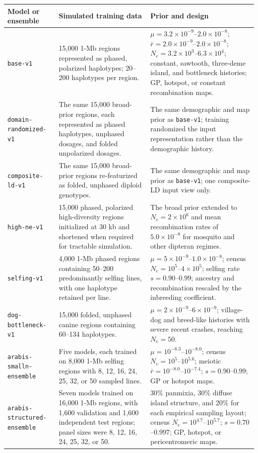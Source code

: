 \scriptsize
\begin{tabular}{@{}p{3.55cm}p{6.15cm}p{7.05cm}@{}}
\toprule
Model or ensemble & Simulated training data & Prior and design \\
\midrule
\texttt{base-v1} & 15,000 1-Mb regions represented as phased, polarized haplotypes; 20--200 haplotypes per region. & $\mu=3.2\times10^{-9}$--$2.0\times10^{-8}$; $\bar r=2.0\times10^{-9}$--$2.0\times10^{-8}$; $N_e=3.2\times10^3$--$6.3\times10^4$; constant, sawtooth, three-deme island, and bottleneck histories; GP, hotspot, or constant recombination maps. \\
\texttt{domain-randomized-v1} & The same 15,000 broad-prior regions, each represented as phased haplotypes, unphased dosages, and folded unpolarized dosages. & The same demographic and map prior as \texttt{base-v1}; training randomized the input representation rather than the demographic history. \\
\texttt{composite-ld-v1} & The same 15,000 broad-prior regions re-featurized as folded, unphased diploid genotypes. & The same demographic and map prior as \texttt{base-v1}; one composite-LD input view only. \\
\texttt{high-ne-v1} & 15,000 phased, polarized high-diversity regions initialized at 30 kb and shortened when required for tractable simulation. & The broad prior extended to $N_e=2\times10^6$ and mean recombination rates of $5.0\times10^{-8}$ for mosquito and other dipteran regimes. \\
\texttt{selfing-v1} & 4,000 1-Mb phased regions containing 50--200 predominantly selfing lines, with one haplotype retained per line. & $\mu=5\times10^{-9}$--$1.0\times10^{-8}$; census $N_e=10^5$--$4\times10^5$; selfing rate $s=0.90$--$0.99$; ancestry and recombination rescaled by the inbreeding coefficient. \\
\texttt{dog-bottleneck-v1} & 15,000 folded, unphased canine regions containing 60--134 haplotypes. & $\mu=2\times10^{-9}$--$6\times10^{-9}$; village-dog and breed-like histories with severe recent crashes, reaching $N_e=50$. \\
\texttt{arabis-smalln-ensemble} & Five models, each trained on 8,000 1-Mb selfing regions with 8, 12, 16, 24, 25, 32, or 50 sampled lines. & $\mu=10^{-8.3}$--$10^{-8.0}$; census $N_e=10^5$--$10^{5.6}$; meiotic $\bar r=10^{-8.0}$--$10^{-7.4}$; $s=0.90$--$0.99$; GP or hotspot maps. \\
\texttt{arabis-structured-ensemble} & Seven models trained on 16,000 1-Mb regions, with 1,600 validation and 1,600 independent test regions; panel sizes were 8, 12, 16, 24, 25, 32, or 50. & 30\% panmixia, 30\% diffuse island structure, and 20\% for each empirical sampling layout; census $N_e=10^{4.7}$--$10^{5.7}$; $s=0.70$--$0.997$; GP, hotspot, or pericentromeric maps. \\

\end{tabular}
